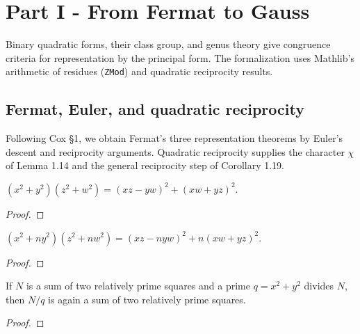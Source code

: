%
%

\chapter{Part I - From Fermat to Gauss}

Binary quadratic forms, their class group, and genus theory give congruence
criteria for representation by the principal form. The formalization uses
Mathlib's arithmetic of residues (\texttt{ZMod}) and quadratic reciprocity results.

\section{Fermat, Euler, and quadratic reciprocity}

Following Cox \S1, we obtain Fermat's three representation theorems by Euler's
descent and reciprocity arguments. Quadratic reciprocity supplies the character
$\chi$ of Lemma 1.14 and the general reciprocity step of Corollary 1.19.

\begin{theorem}
  \label{eq:mul_sq_add_sq}
  \leanok
  $(x^2+y^2)(z^2+w^2) = (xz - yw)^2 + (xw + yz)^2$.
\end{theorem}
\begin{proof}\leanok\end{proof}

\begin{theorem}
  \label{eq:mul_sq_add_nsq}
  \leanok
  $(x^2+ny^2)(z^2+nw^2) = (xz - nyw)^2 + n(xw + yz)^2$.
\end{theorem}
\begin{proof}\leanok\end{proof}

\begin{theorem}
  \label{lem:descent_lemma}
  \leanok
  If $N$ is a sum of two relatively prime squares and a prime $q = x^2+y^2$
  divides $N$, then $N/q$ is again a sum of two relatively prime squares.
\end{theorem}
\begin{proof}
\end{proof}

